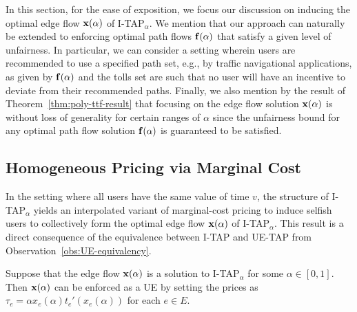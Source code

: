 \documentclass{article}
\newif\ifarxiv   %
\begin{document}
In this section, for the ease of exposition, we focus our discussion on inducing the optimal edge flow $\mathbf{x}(\alpha)$ of I-TAP$_{\alpha}$. We mention that our approach can naturally be extended to enforcing optimal path flows $\mathbf{f}(\alpha)$ that satisfy a given level of unfairness. In particular, we can consider a setting wherein users are recommended to use a specified path set, e.g., by traffic navigational applications, as given by $\mathbf{f}(\alpha)$ and the tolls set are such that no user will have an incentive to deviate from their recommended paths. Finally, we also mention by the result of Theorem~\ref{thm:poly-ttf-result} that focusing on the edge flow solution $\mathbf{x}(\alpha)$ is without loss of generality for certain ranges of $\alpha$ since the unfairness bound for any optimal path flow solution $\mathbf{f}(\alpha)$ is guaranteed to be satisfied.

\subsection{Homogeneous Pricing via Marginal Cost} \label{sec:pricing-homogeneous}

In the setting where all users have the same value of time $v$, the structure of I-TAP$_{\alpha}$ yields an interpolated variant of marginal-cost pricing to induce selfish users to collectively form the optimal edge flow $\mathbf{x}(\alpha)$ of I-TAP$_{\alpha}$. This result is a direct consequence of the equivalence between I-TAP and UE-TAP from Observation~\ref{obs:UE-equivalency}.

\begin{lemma}  \label{lem:pricing-homogeneous}
Suppose that the edge flow $\mathbf{x}(\alpha)$ is a solution to I-TAP$_\alpha$ for some $\alpha\in [0,1]$. Then $\mathbf{x}(\alpha)$ can be enforced as a UE by setting the prices as $\tau_e = \alpha x_e(\alpha) t_e'(x_e(\alpha))$ for each $e \in E$.
\end{lemma}

\ifarxiv
\begin{proof}
Without loss of generality, normalize $v$ to 1 and for notational convenience, denote $x_e = x_e(\alpha)$. To prove this result, note from Observation~\ref{obs:UE-equivalency} that I-TAP$_{\alpha}$ is equivalent to UE-TAP with objective $\sum_{e\in E}\int_{0}^{x_e} t_e(y) + \alpha y t_e'(y) \dd{y}$. From the first-order necessary and sufficient KKT conditions~\cite{Sheffi1985} of this UE-TAP, for any two paths $P, Q \in \mathcal{P}_k$ with positive flow for a commodity $k \in K$, it must be that $\sum_{e \in P} \left( t_e(x_e) + \alpha x_e t_e'(x_e) \right) = \sum_{e \in Q} \left( t_e(x_e) + \alpha x_e t_e'(x_e) \right)$. Thus, if the prices on each edge are set as $\tau_e = \alpha x_e t_e'(x_e)$, then all users in each commodity incur the same travel cost when using any two paths $P, Q \in \mathcal{P}_k$, establishing that $\x$ is a UE.
\end{proof}
\fi
\end{document}
